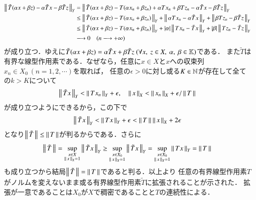 \begin{prf}
\begin{align}
			\left\|\, \tilde{T}(\alpha x + \beta z) - \alpha \tilde{T}x - \beta \tilde{T}z\, \right\|_{Y}
			&= \left\|\, \tilde{T}(\alpha x + \beta z) - T(\alpha x_n + \beta z_n) + \alpha Tx_n + \beta Tz_n - \alpha \tilde{T}x - \beta \tilde{T}z\, \right\|_{Y} \\
			&\leq \left\|\, \tilde{T}(\alpha x + \beta z) - T(\alpha x_n + \beta z_n)\, \right\|_{Y}
				+ \left\|\, \alpha Tx_n - \alpha \tilde{T}x\, \right\|_{Y} + \left\|\, \beta Tz_n - \beta \tilde{T}z\, \right\|_{Y} \\
			&\leq \left\|\, \tilde{T}(\alpha x + \beta z) - T(\alpha x_n + \beta z_n)\, \right\|_{Y}
				+ |\alpha| \left\|\, Tx_n - \tilde{T}x\, \right\|_{Y} + |\beta| \left\|\, Tz_n - \tilde{T}z\, \right\|_{Y} \\
			&\longrightarrow 0\quad (n \longrightarrow +\infty)
		\end{align}
		が成り立つ．ゆえに$\tilde{T}(\alpha x + \beta z) = \alpha \tilde{T}x + \beta \tilde{T}z\ (\forall x,\ z \in X,\ \alpha,\ \beta \in \mathbb{K})$である．
		また$\tilde{T}$は有界な線型作用素である．なぜなら，任意に$x \in X$と$x$への収束列$x_n \in X_0\ (n = 1,2,\cdots)$を取れば，
		任意の$\epsilon > 0$に対し或る$K \in \mathbb{N}$が存在して全ての$k > K$について
		\begin{align}
			\left\|\, \tilde{T}x\, \right\|_{Y} < \left\|\, Tx_n\, \right\|_{Y} + \epsilon, \quad \left\|\, x\, \right\|_{X} < \left\|\, x_n\, \right\|_{X} + \epsilon/\left\|\, T\, \right\|_{}
		\end{align}
		が成り立つようにできるから，この下で
		\begin{align}
			\left\|\, \tilde{T}x\, \right\|_{Y} < \left\|\, Tx\, \right\|_{Y} + \epsilon < \left\|\, T\, \right\|_{} \left\|\, x\, \right\|_{X} + 2\epsilon
		\end{align}
		となり$\left\|\, \tilde{T}\, \right\|_{} \leq \left\|\, T\, \right\|_{}$が判るからである．さらに
		\begin{align}
			\left\|\, \tilde{T}\, \right\|_{} = \operatorname*{sup}_{\substack{x \in X \\ \left\|\, x\, \right\|_{X} = 1}} \left\|\, \tilde{T}x\, \right\|_{Y} 
			\geq \operatorname*{sup}_{\substack{x \in X_0 \\ \left\|\, x\, \right\|_{X} = 1}} \left\|\, \tilde{T}x\, \right\|_{Y} 
			= \operatorname*{sup}_{\substack{x \in X_0 \\ \left\|\, x\, \right\|_{X} = 1}} \left\|\, Tx\, \right\|_{Y} = \left\|\, T\, \right\|_{}
		\end{align}
		も成り立つから結局$\left\|\, \tilde{T}\, \right\|_{} = \left\|\, T\, \right\|_{}$であると判る．以上より
		任意の有界線型作用素$T$がノルムを変えないまま或る有界線型作用素$\tilde{T}$に拡張されることが示された．
		拡張が一意であることは$X_0$が$X$で稠密であることと$T$の連続性による．
		\QED
\end{prf}

